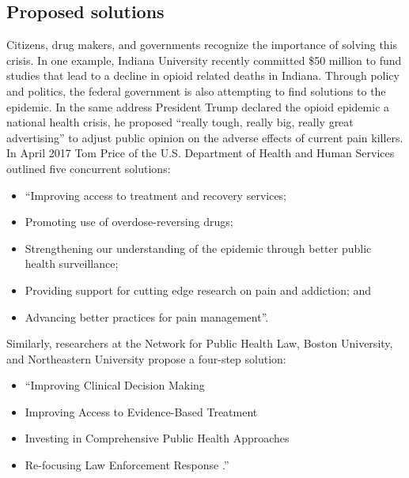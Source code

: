 \documentclass[sigconf]{acmart}
\begin{document}
\subsection{Proposed solutions}
Citizens, drug makers, and governments recognize the importance of solving this crisis. In one example, Indiana University recently committed \$50 million to fund studies that lead to a decline in opioid related deaths in Indiana. Through policy and politics, the federal government is also attempting to find solutions to the epidemic. In the same address President Trump declared the opioid epidemic a national health crisis, he proposed “really tough, really big, really great advertising” to adjust public opinion on the adverse effects of current pain killers\cite{opsis6}. In April 2017 Tom Price of the U.S. Department of Health and Human Services outlined five concurrent solutions:
\begin{itemize}
\item “Improving access to treatment and recovery services;
\item Promoting use of overdose-reversing drugs;
\item Strengthening our understanding of the epidemic through better public health surveillance;
\item Providing support for cutting edge research on pain and addiction; and
\item Advancing better practices for pain management”\cite{opsis7}.
\end{itemize} 

Similarly, researchers at the Network for Public Health Law, Boston University, and Northeastern University propose a four-step solution:
\begin{itemize}
\item “Improving Clinical Decision Making
\item Improving Access to Evidence-Based Treatment
\item Investing in Comprehensive Public Health Approaches
\item Re-focusing Law Enforcement Response \cite{Davis01}.”
\end{itemize}
\end{document}
